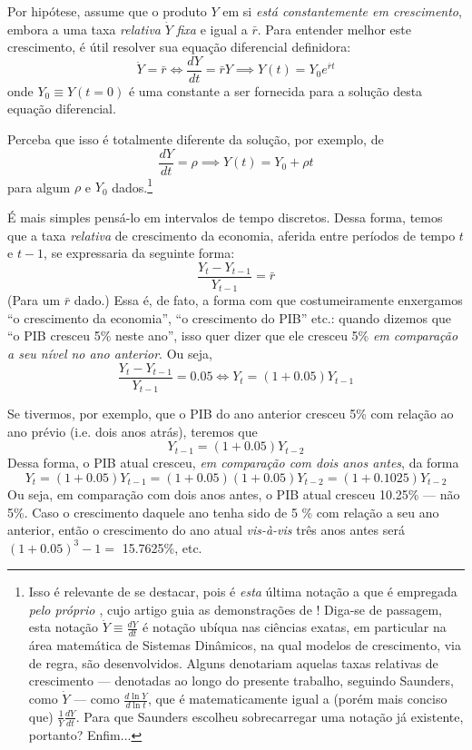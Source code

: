 Por hipótese, \textcite{Saunders1992} assume que o produto $Y$ em si \textit{está constantemente em crescimento}, embora a uma taxa \textit{relativa} $\dot{Y}$ \textit{fixa} e igual a $\bar{r}$. Para entender melhor este crescimento, é útil resolver sua equação diferencial definidora:
$$
\dot{Y} = \bar{r} \iff \frac{dY}{dt} = \bar{r} Y \implies Y(t) = Y_0 e^{\bar{r}t}
$$ 
onde $Y_0 \equiv Y(t=0)$ é uma constante a ser fornecida para a solução desta equação diferencial. 

Perceba que isso é totalmente diferente da solução, por exemplo, de
$$
\frac{dY}{dt} = \rho \implies Y(t) = Y_0 + \rho t
$$
para algum $\rho$ e $Y_0$ dados.\footnote{Isso é relevante de se destacar, pois é \textit{esta} última notação a que é empregada \textit{pelo próprio \textcite{Solow1956}}, cujo artigo guia as demonstrações de \textcite{Saunders1992}! Diga-se de passagem, esta notação $\dot{Y} \equiv \frac{dY}{dt}$ é notação ubíqua nas ciências exatas, em particular na área matemática de Sistemas Dinâmicos, na qual modelos de crescimento, via de regra, são desenvolvidos. Alguns denotariam aquelas taxas relativas de crescimento --- denotadas ao longo do presente trabalho, seguindo Saunders, como $\dot{Y}$ --- como $\frac{d \ln Y}{d \ln t}$, que é matematicamente igual a (porém mais conciso que) $\frac{1}{Y} \frac{dY}{dt}$. Para que Saunders escolheu sobrecarregar uma notação já existente, portanto? Enfim...} 

É mais simples pensá-lo em intervalos de tempo discretos. Dessa forma, temos que a taxa \textit{relativa} de crescimento da economia, aferida entre períodos de tempo $t$ e $t-1$, se expressaria da seguinte forma:
$$
\frac{Y_{t} - Y_{t-1}}{Y_{t-1}} = \bar{r}
$$
(Para um $\bar{r}$ dado.) Essa é, de fato, a forma com que costumeiramente enxergamos ``o crescimento da economia'', ``o crescimento do PIB'' etc.: quando dizemos que ``o PIB cresceu 5\% neste ano'', isso quer dizer que ele cresceu 5\% \textit{em comparação a seu nível no ano anterior}. Ou seja,
$$
\frac{Y_t - Y_{t-1}}{Y_{t-1}} = 0.05 \iff Y_t = (1+0.05) Y_{t-1}
$$

Se tivermos, por exemplo, que o PIB do ano anterior cresceu 5\% com relação ao ano prévio (i.e. dois anos atrás), teremos que
$$
Y_{t-1} = (1+0.05) Y_{t-2}
$$
Dessa forma, o PIB atual cresceu, \textit{em comparação com dois anos antes}, da forma
$$
Y_t = (1+0.05) Y_{t-1} = (1+0.05)(1+0.05) Y_{t-2} = (1+0.1025) Y_{t-2}
$$
Ou seja, em comparação com dois anos antes, o PIB atual cresceu 10.25\% --- não 5\%. Caso o crescimento daquele ano tenha sido de 5 \% com relação a seu ano anterior, então o crescimento do ano atual \textit{vis-à-vis} três anos antes será $(1+0.05)^3-1=$ 15.7625\%, etc. 

